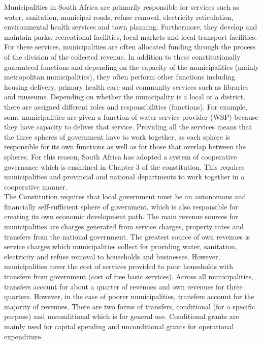 \documentclass[dvipdfmx]{jsarticle}
\begin{document}
\quad Municipalities in South Africa are primarily responsible for services such as water, sanitation, municipal roads, refuse removal, electricity reticulation, environmental health services and town planning. Furthermore, they develop and maintain parks, recreational facilities, local markets and local transport facilities. For these services, municipalities are often allocated funding through the process of the division of the collected revenue. In addition to these constitutionally guaranteed functions and depending on the capacity of the municipalities (mainly metropolitan municipalities), they often perform other functions including housing delivery, primary health care and community services such as libraries and museums. Depending on whether the municipality is a local or a district, there are assigned different roles and responsibilities (functions). For example, some municipalities are given a function of water service provider (WSP) because they have capacity to deliver that service. Providing all the services means that the three spheres of government have to work together, as each sphere is responsible for its own functions as well as for those that overlap between the spheres. For this reason, South Africa has adopted a system of cooperative governance which is enshrined in Chapter 3 of the constitution. This requires municipalities and provincial and national departments to work together in a cooperative manner.  \\
\quad The Constitution requires that local government must be an autonomous and financially self-sufficient sphere of government, which is also responsible for creating its own economic development path. The main revenue sources for municipalities are charges generated from service charges, property rates and transfers from the national government. The greatest source of own revenues is service charges which municipalities collect for providing water, sanitation, electricity and refuse removal to households and businesses. However, municipalities cover the cost of services provided to poor households with transfers from government (cost of free basic services). Across all municipalities, transfers account for about a quarter of revenues and own revenues for three quarters. However, in the case of poorer municipalities, transfers account for the majority of revenues. There are two forms of transfers, conditional (for a specific purpose) and unconditional which is for general use. Conditional grants are mainly used for capital spending and unconditional grants for operational expenditure.
\end{document}

